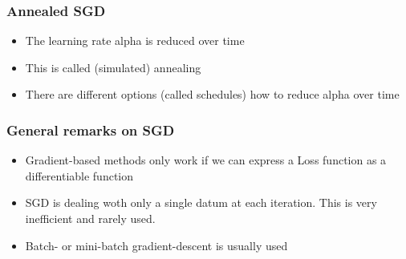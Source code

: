 \subsubsection{Annealed SGD}
\begin{itemize}
    \item The learning rate alpha is reduced over time
    \item This is called (simulated) annealing
    \item There are different options (called schedules) how to reduce alpha over time
\end{itemize}

\subsubsection{General remarks on SGD}
\begin{itemize}
    \item Gradient-based methods only work if we can express a Loss function as a differentiable function
    \item SGD is dealing woth only a single datum at each iteration. This is very inefficient and rarely used.
    \item Batch- or mini-batch gradient-descent is usually used
\end{itemize}